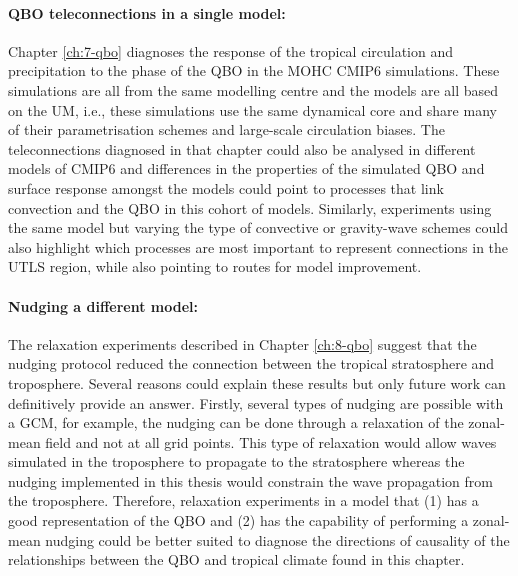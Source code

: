\paragraph{QBO teleconnections in a single model:}
Chapter \ref{ch:7-qbo} diagnoses the response of the tropical circulation and precipitation to the phase of the QBO in the MOHC CMIP6 simulations. 
These simulations are all from the same modelling centre and the models are all based on the UM, i.e., these simulations use the same dynamical core and share many of their parametrisation schemes and large-scale circulation biases. 
The teleconnections diagnosed in that chapter could also be analysed in different models of CMIP6 and differences in the properties of the simulated QBO and surface response amongst the models could point to processes that link convection and the QBO in this cohort of models. 
Similarly, experiments using the same model but varying the type of convective or gravity-wave schemes could also highlight which processes are most important to represent connections in the UTLS region, while also pointing to routes for model improvement. 

\paragraph{Nudging a different model:} 
The relaxation experiments described in Chapter \ref{ch:8-qbo} suggest that the nudging protocol reduced the connection between the tropical stratosphere and troposphere. 
Several reasons could explain these results but only future work can definitively provide an answer. 
Firstly, several types of nudging are possible with a GCM, for example, the nudging can be done through a relaxation of the zonal-mean field and not at all grid points. 
This type of relaxation would allow waves simulated in the troposphere to propagate to the stratosphere whereas the nudging implemented in this thesis would constrain the wave propagation from the troposphere. 
Therefore, relaxation experiments in a model that (1) has a good representation of the QBO and (2) has the capability of performing a zonal-mean nudging could be better suited to diagnose the directions of causality of the relationships between the QBO and tropical climate found in this chapter.

 




